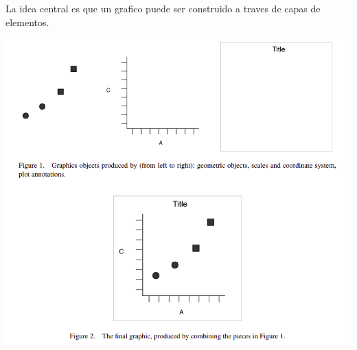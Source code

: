 \documentclass[
  10pt,
  ignorenonframetext,
]{beamer}
\begin{document}
\begin{frame}{}
\protect\hypertarget{section-3}{}

La idea central es que un grafico puede ser construido a traves de capas
de elementos.

\begin{center}\includegraphics[width=0.72\linewidth]{../../imgs/logica_layered_grammar_of_graphics} \end{center}
\end{frame}
\end{document}

